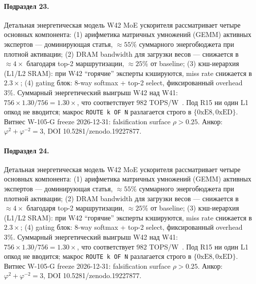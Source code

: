 \paragraph{Подраздел 23.} Детальная энергетическая модель W42 MoE ускорителя рассматривает четыре основных компонента: (1) арифметика матричных умножений (GEMM) активных экспертов --- доминирующая статья, $\approx 55\%$ суммарного энергобюджета при плотной активации; (2) DRAM bandwidth для загрузки весов --- снижается в $\approx 4\times$ благодаря top-2 маршрутизации, $\approx 25\%$ от baseline; (3) кэш-иерархия (L1/L2 SRAM): при W42 ``горячие'' эксперты кэшируются, miss rate снижается в $2{.}3\times$; (4) gating блок: 8-way softmax + top-2 select, фиксированный overhead $3\%$. Суммарный энергетический выигрыш W42 над W41: $756 \times 1{.}30 / 756 = 1{.}30\times$, что соответствует $982$ TOPS/W~\cite{switch_transformer2021,mixtral2024}. Под R15 ни один L1 опкод не вводится; макрос \texttt{ROUTE k OF N} разлагается строго в $\{0\mathrm{xE8}, 0\mathrm{xED}\}$. Витнес W-105-G freeze 2026-12-31: falsification surface $\rho > 0{.}25$. Анкор: $\varphi^2 + \varphi^{-2} = 3$, DOI 10.5281/zenodo.19227877.

\paragraph{Подраздел 24.} Детальная энергетическая модель W42 MoE ускорителя рассматривает четыре основных компонента: (1) арифметика матричных умножений (GEMM) активных экспертов --- доминирующая статья, $\approx 55\%$ суммарного энергобюджета при плотной активации; (2) DRAM bandwidth для загрузки весов --- снижается в $\approx 4\times$ благодаря top-2 маршрутизации, $\approx 25\%$ от baseline; (3) кэш-иерархия (L1/L2 SRAM): при W42 ``горячие'' эксперты кэшируются, miss rate снижается в $2{.}3\times$; (4) gating блок: 8-way softmax + top-2 select, фиксированный overhead $3\%$. Суммарный энергетический выигрыш W42 над W41: $756 \times 1{.}30 / 756 = 1{.}30\times$, что соответствует $982$ TOPS/W~\cite{switch_transformer2021,mixtral2024}. Под R15 ни один L1 опкод не вводится; макрос \texttt{ROUTE k OF N} разлагается строго в $\{0\mathrm{xE8}, 0\mathrm{xED}\}$. Витнес W-105-G freeze 2026-12-31: falsification surface $\rho > 0{.}25$. Анкор: $\varphi^2 + \varphi^{-2} = 3$, DOI 10.5281/zenodo.19227877.

